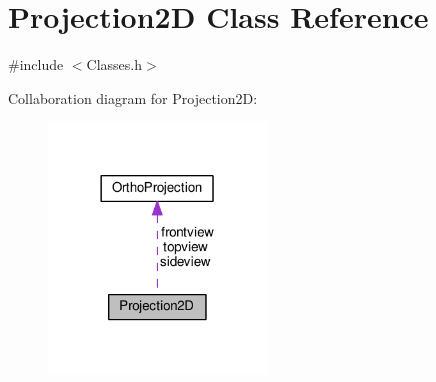 \hypertarget{class_projection2_d}{}\section{Projection2D Class Reference}
\label{class_projection2_d}


{\ttfamily \#include $<$Classes.\+h$>$}



Collaboration diagram for Projection2D\+:\nopagebreak
\begin{figure}[H]
\begin{center}
\leavevmode
\includegraphics[width=165pt]{class_projection2_d__coll__graph}
\end{center}
\end{figure}
